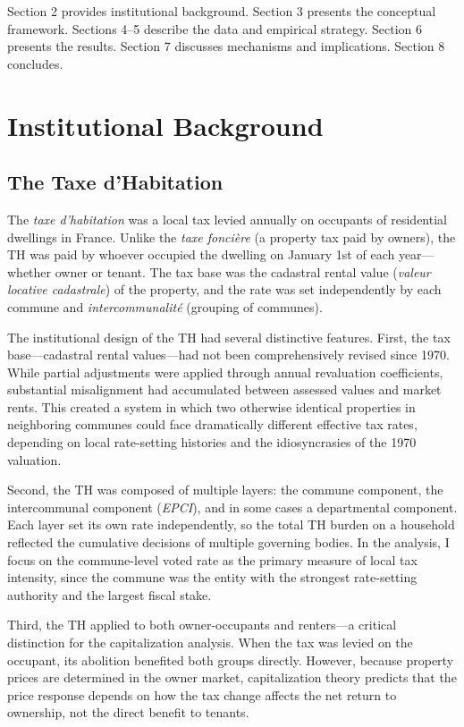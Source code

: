 \documentclass[12pt]{article}
\begin{document}
Section 2 provides institutional background. Section 3 presents the conceptual framework. Sections 4--5 describe the data and empirical strategy. Section 6 presents the results. Section 7 discusses mechanisms and implications. Section 8 concludes.


\section{Institutional Background}

\subsection{The Taxe d'Habitation}

The \emph{taxe d'habitation} was a local tax levied annually on occupants of residential dwellings in France. Unlike the \emph{taxe fonci\`ere} (a property tax paid by owners), the TH was paid by whoever occupied the dwelling on January 1st of each year---whether owner or tenant. The tax base was the cadastral rental value (\emph{valeur locative cadastrale}) of the property, and the rate was set independently by each commune and \emph{intercommunalit\'e} (grouping of communes).

The institutional design of the TH had several distinctive features. First, the tax base---cadastral rental values---had not been comprehensively revised since 1970. While partial adjustments were applied through annual revaluation coefficients, substantial misalignment had accumulated between assessed values and market rents. This created a system in which two otherwise identical properties in neighboring communes could face dramatically different effective tax rates, depending on local rate-setting histories and the idiosyncrasies of the 1970 valuation.

Second, the TH was composed of multiple layers: the commune component, the intercommunal component (\emph{EPCI}), and in some cases a departmental component. Each layer set its own rate independently, so the total TH burden on a household reflected the cumulative decisions of multiple governing bodies. In the analysis, I focus on the commune-level voted rate as the primary measure of local tax intensity, since the commune was the entity with the strongest rate-setting authority and the largest fiscal stake.

Third, the TH applied to both owner-occupants and renters---a critical distinction for the capitalization analysis. When the tax was levied on the occupant, its abolition benefited both groups directly. However, because property prices are determined in the owner market, capitalization theory predicts that the price response depends on how the tax change affects the net return to ownership, not the direct benefit to tenants.
\end{document}

